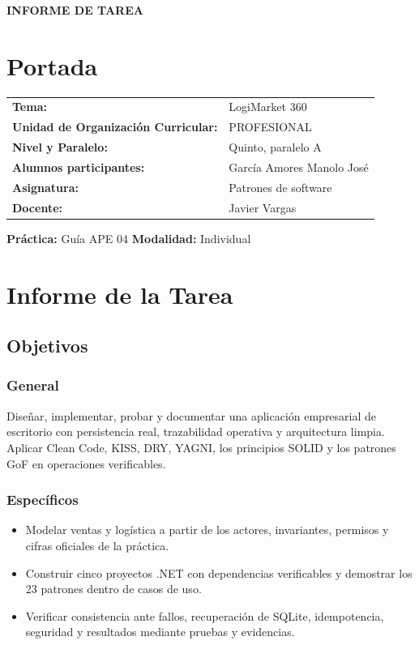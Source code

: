 \documentclass{article}
\begin{document}
\begin{center}
    {\large\textbf{INFORME DE TAREA}}
\end{center}

\section{Portada}
\noindent\begin{tabularx}{\linewidth}{@{}L{.37\linewidth} >{\raggedright\arraybackslash}X@{}}
\textbf{Tema:} & LogiMarket 360\\[5pt]
\textbf{Unidad de Organización Curricular:} & PROFESIONAL\\[5pt]
\textbf{Nivel y Paralelo:} & Quinto, paralelo A\\[5pt]
\textbf{Alumnos participantes:} & García Amores Manolo José\\[5pt]
\textbf{Asignatura:} & Patrones de software\\[5pt]
\textbf{Docente:} & Javier Vargas\\
\end{tabularx}
\par\medskip
\noindent\textbf{Práctica:} Guía APE 04 \hfill
\textbf{Modalidad:} Individual

\section{Informe de la Tarea}
\subsection{Objetivos}
\subsubsection{General}
Diseñar, implementar, probar y documentar una aplicación empresarial de escritorio con persistencia real, trazabilidad operativa y arquitectura limpia. Aplicar Clean Code, KISS, DRY, YAGNI, los principios SOLID y los patrones GoF en operaciones verificables.

\subsubsection{Específicos}
\begin{itemize}
\item Modelar ventas y logística a partir de los actores, invariantes, permisos y cifras oficiales de la práctica.
\item Construir cinco proyectos .NET con dependencias verificables y demostrar los 23 patrones dentro de casos de uso.
\item Verificar consistencia ante fallos, recuperación de SQLite, idempotencia, seguridad y resultados mediante pruebas y evidencias.
\end{itemize}
\end{document}
